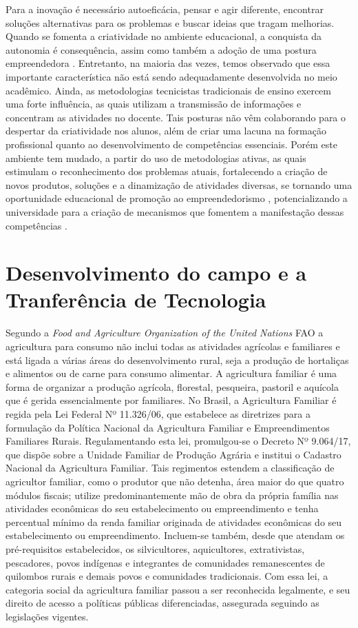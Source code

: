 Para a inovação é necessário autoeficácia, pensar e agir diferente, encontrar soluções alternativas para os problemas e buscar ideias que tragam melhorias. Quando se fomenta a criatividade no ambiente educacional, a conquista da autonomia é consequência, assim como também a adoção de uma postura empreendedora \cite{gonzalez_predictors_2009}. Entretanto, na maioria das vezes, temos observado que essa importante característica não está sendo adequadamente desenvolvida no meio acadêmico. Ainda, as metodologias tecnicistas tradicionais de ensino exercem uma forte influência, as quais utilizam a transmissão de informações e concentram as atividades no docente. Tais posturas não vêm colaborando para o despertar da criatividade nos alunos, além de criar uma lacuna na formação profissional quanto ao desenvolvimento de competências essenciais. Porém este ambiente tem mudado, a partir do uso de metodologias ativas, as quais estimulam o reconhecimento dos problemas atuais, fortalecendo a criação de novos produtos, soluções e a dinamização de atividades diversas, se tornando uma oportunidade educacional de promoção ao empreendedorismo \cite{faria_promocao_2018}, potencializando a universidade para a criação de mecanismos que fomentem a manifestação dessas competências \cite{audy_innovation_2006}.

\section{Desenvolvimento do campo e a Tranferência de Tecnologia}

Segundo a \textit{Food and Agriculture Organization of the United Nations} FAO \cite{fao_panorama_2017} a agricultura para consumo não inclui todas as atividades agrícolas e familiares e está ligada a várias áreas do desenvolvimento rural, seja  a produção de hortaliças e alimentos ou de carne para consumo alimentar. A agricultura familiar é uma forma de organizar a produção agrícola, florestal, pesqueira, pastoril e aquícola que é gerida essencialmente por familiares. No Brasil, a Agricultura Familiar é regida pela Lei Federal Nº 11.326/06, que estabelece as diretrizes para a formulação da Política Nacional da Agricultura Familiar e Empreendimentos Familiares Rurais. Regulamentando esta lei, promulgou-se o Decreto Nº 9.064/17, que dispõe sobre a Unidade Familiar de Produção Agrária e institui o Cadastro Nacional da Agricultura Familiar. Tais regimentos estendem a classificação de agricultor familiar, como o produtor que não detenha, área maior do que quatro módulos fiscais; utilize predominantemente mão de obra da própria família nas atividades econômicas do seu estabelecimento ou empreendimento e tenha percentual mínimo da renda familiar originada de atividades econômicas do seu estabelecimento ou empreendimento. Incluem-se também, desde que atendam os pré-requisitos estabelecidos, os silvicultores, aquicultores, extrativistas, pescadores, povos indígenas e integrantes de comunidades remanescentes de quilombos rurais e demais povos e comunidades tradicionais. Com essa lei, a categoria social da agricultura familiar passou a ser reconhecida legalmente, e seu direito de acesso a políticas públicas diferenciadas, assegurada seguindo as legislações vigentes.


